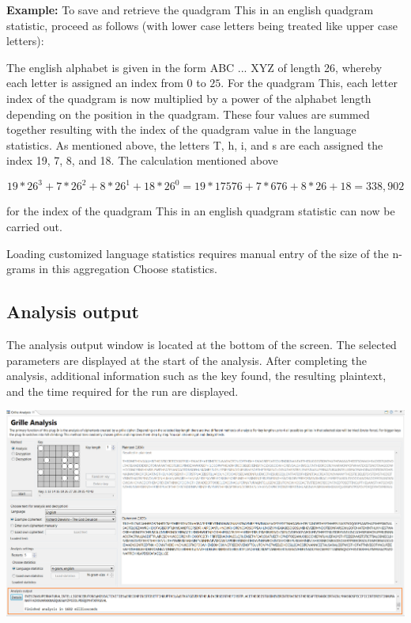 \documentclass[fontsize=12pt, DIV=15, parskip=half-]{scrartcl}
\theoremstyle{break}
\begin{document}
\begin{enumerate}[label=(\alph*), leftmargin=*]
\textbf{Example:}
To save and retrieve the quadgram \glqq This\grqq{} in an english quadgram statistic, proceed as follows (with lower case letters being treated like upper case letters):

The english alphabet is given  in the form \glqq ABC ... XYZ\grqq{} of length 26, whereby each letter is assigned an index from $ 0 $ to $ 25 $. For the quadgram \glqq This\grqq, each letter index of the quadgram is now multiplied by a power of the alphabet length depending on the position in the quadgram. These four values are summed together resulting with the index of the quadgram value in the language statistics. As mentioned above, the letters T, h, i, and s are each assigned the index 19, 7, 8, and 18. The calculation mentioned above

\[
19*26^3+7*26^2+8*26^1+18*26^0=19*17576+7*676+8*26+18=338,902
\]

for the index of the quadgram \glqq This\grqq{} in an english quadgram statistic can now be carried out.

Loading customized language statistics requires manual entry of the size of the n-grams in this aggregation \glqq Choose statistics\grqq .
\end{enumerate}
\newpage

\subsection{Analysis output}

The analysis output window is located at the bottom of the screen. The selected parameters are displayed at the start of the analysis. After completing the analysis, additional information such as the key found, the resulting plaintext, and the time required for the run are displayed. 

\includegraphics[scale=0.45]{enFleissnerAusgabeAnalyse.png}
\end{document}
